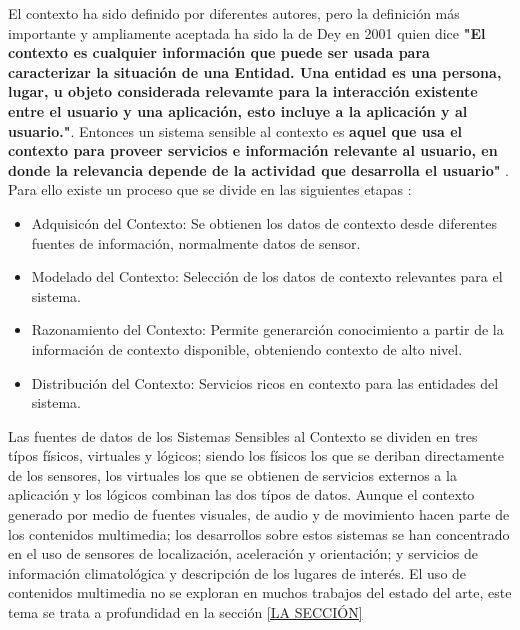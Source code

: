 El contexto ha sido definido por diferentes autores, pero la definición más importante y ampliamente aceptada ha sido la de Dey en 2001 quien dice \textbf{"El contexto es cualquier información que puede ser usada para caracterizar la situación de una Entidad. Una entidad es una persona, lugar, u objeto considerada relevamte para la interacción existente entre el usuario y una aplicación, esto incluye a la aplicación y al usuario."}. Entonces un sistema sensible al contexto es \textbf{aquel que usa el contexto para proveer servicios e información relevante al usuario, en donde la relevancia depende de la actividad que desarrolla el usuario"}  \cite{Dey2001}.
Para ello existe un proceso que se divide en las siguientes etapas \cite{Perera2014}:

\begin{itemize}
    \item Adquisicón del Contexto: Se obtienen los datos de contexto desde diferentes fuentes de información, normalmente datos de sensor.
    \item Modelado del Contexto: Selección de los datos de contexto relevantes para el sistema.
    \item Razonamiento del Contexto: Permite generarción conocimiento a partir de la información de contexto disponible, obteniendo contexto de alto nivel.
    \item Distribución del Contexto: Servicios ricos en contexto para las entidades del sistema.
\end{itemize}

Las fuentes de datos de los Sistemas Sensibles al Contexto se dividen en tres típos físicos, virtuales y lógicos; siendo los físicos los que se deriban directamente de los sensores, los virtuales los que se obtienen de servicios externos a la aplicación y los lógicos combinan las dos típos de datos. Aunque el contexto generado por medio de fuentes visuales, de audio y de movimiento hacen parte de los contenidos multimedia; los desarrollos sobre estos sistemas se han concentrado en el uso de sensores de localización, aceleración y orientación; y servicios de información climatológica y descripción de los lugares de interés. El uso de contenidos multimedia no se exploran en muchos trabajos del estado del arte, este tema se trata a profundidad en la sección \ref{LA SECCIÓN}

